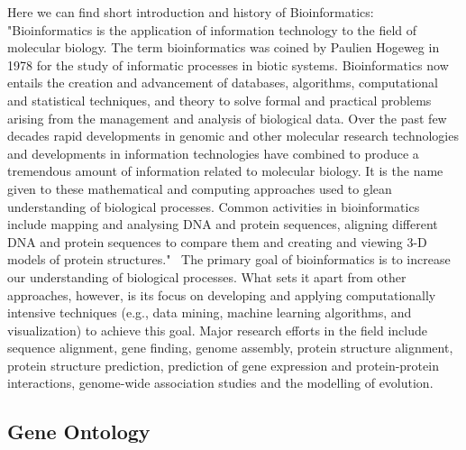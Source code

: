 Here we can find short introduction and history of Bioinformatics: "Bioinformatics is the application of information technology to the field of molecular biology. The term bioinformatics was coined by Paulien Hogeweg in 1978 for the study of informatic processes in biotic systems. Bioinformatics now entails the creation and advancement of databases, algorithms, computational and statistical techniques, and theory to solve formal and practical problems arising from the management and analysis of biological data. Over the past few decades rapid developments in genomic and other molecular research technologies and developments in information technologies have combined to produce a tremendous amount of information related to molecular biology. It is the name given to these mathematical and computing approaches used to glean understanding of biological processes. Common activities in bioinformatics include mapping and analysing DNA and protein sequences, aligning different DNA and protein sequences to compare them and creating and viewing 3-D models of protein structures."~\cite{Bioinformatic}
The primary goal of bioinformatics is to increase our understanding of biological processes. What sets it apart from other approaches, however, is its focus on developing and applying computationally intensive techniques (e.g., data mining, machine learning algorithms, and visualization) to achieve this goal. Major research efforts in the field include sequence alignment, gene finding, genome assembly, protein structure alignment, protein structure prediction, prediction of gene expression and protein-protein interactions, genome-wide association studies and the modelling of evolution.

\subsection{Gene Ontology}
\label{sec:gene_ontology}

